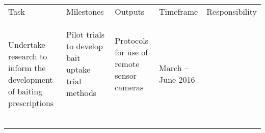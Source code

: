 \documentclass[version=last,
    paper=a4,                               %
    10pt,                                   %
    dvipsnames,
    oneside,                              %
    headings=openany,                       %
    open=any,
    BCOR=7mm,                               %
    DIV=15,     %
]{scrbook}
\begin{document}
\begin{longtable}[c]{@{}lllll@{}}
\toprule\addlinespace
\begin{minipage}[t]{0.17\columnwidth}\raggedright
Task
\end{minipage} & \begin{minipage}[t]{0.17\columnwidth}\raggedright
Milestones
\end{minipage} & \begin{minipage}[t]{0.17\columnwidth}\raggedright
Outputs
\end{minipage} & \begin{minipage}[t]{0.17\columnwidth}\raggedright
Timeframe
\end{minipage} & \begin{minipage}[t]{0.17\columnwidth}\raggedright
Responsibility
\end{minipage}
\\\addlinespace
\begin{minipage}[t]{0.17\columnwidth}\raggedright
Undertake research to inform the development of baiting prescriptions
\end{minipage} & \begin{minipage}[t]{0.17\columnwidth}\raggedright
Pilot trials to develop bait uptake trial methods

~
\end{minipage} & \begin{minipage}[t]{0.17\columnwidth}\raggedright
Protocols for use of remote sensor cameras

~
\end{minipage} & \begin{minipage}[t]{0.17\columnwidth}\raggedright
March -- June 2016


\end{minipage}
\end{longtable}
\end{document}
